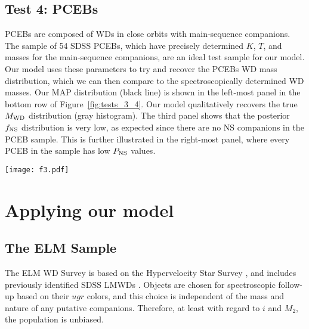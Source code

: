 \documentclass[apjl]{emulateapj}
\newcommand{\period}{T}
\begin{document}
\subsection{Test 4: PCEBs} \label{sec:PCEB}
PCEBs are composed of WDs in close orbits with main-sequence companions. The \citet{nebot11} sample of 54 SDSS PCEBs, which have precisely determined $K$, $\period$, and masses for the main-sequence companions, are an ideal test sample for our model. Our model uses these parameters to try and recover the PCEBs WD mass distribution, which we can then compare to the spectroscopically determined WD masses.
Our MAP distribution (black line) is shown in the left-most panel in the bottom row of Figure~\ref{fig:tests_3_4}. Our model qualitatively recovers the true $M_{\rm WD}$ distribution (gray histogram). The third panel shows that the posterior $f_{\rm NS}$ distribution is very low, as expected since there are no NS companions in the PCEB sample. This is further illustrated in the right-most panel, where every PCEB in the sample has low $P_{\rm NS}$ values.

\begin{figure*}[h!]
\begin{center}
\texttt{[image: f3.pdf]}
\caption{ The results of our model when applied to our third mock data set and the SDSS PCEB sample. The panels are same as those in Figure~\ref{fig:tests_1_2}.}
\label{fig:tests_3_4}
\end{center}
\end{figure*}

\section{Applying our model}
\subsection{The ELM Sample}
The ELM WD Survey is based on the Hypervelocity Star Survey \citep{brown06}, and includes previously identified SDSS LMWDs \citep{eisenstein06,liebert04}. Objects are chosen for spectroscopic follow-up based on their $ugr$ colors, and this choice is independent of the mass and nature of any putative companions. Therefore, at least with regard to $i$ and $M_2$, the population is unbiased.
\end{document}
